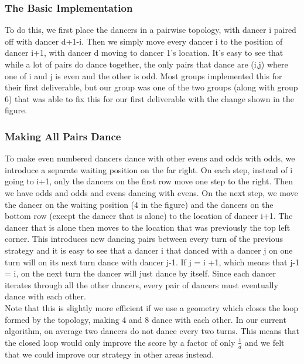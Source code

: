 \subsubsection{The Basic Implementation}
To do this, we first place the dancers in a pairwise topology, with dancer i paired off with dancer d+1-i. Then we simply move every dancer i to the position of dancer i+1, with dancer d moving to dancer 1's location. It's easy to see that while a lot of pairs do dance together, the only pairs that dance are (i,j) where one of i and j is even and the other is odd. Most groups implemented this for their first deliverable, but our group was one of the two groups (along with group 6) that was able to fix this for our first deliverable with the change shown in the figure.\\
\subsubsection{Making All Pairs Dance}
To make even numbered dancers dance with other evens and odds with odds, we introduce a separate waiting position on the far right. On each step, instead of i going to i+1, only the dancers on the first row move one step to the right. Then we have odds and odds and evens dancing with evens. On the next step, we move the dancer on the waiting position (4 in the figure) and the dancers on the bottom row (except the dancer that is alone) to the location of dancer i+1. The dancer that is alone then moves to the location that was previously the top left corner. This introduces new dancing pairs between every turn of the previous strategy and it is easy to see that a dancer i that danced with a dancer j on one turn will on its next turn dance with dancer j-1. If j = i +1, which means that j-1 = i, on the next turn the dancer will just dance by itself. Since each dancer iterates through all the other dancers, every pair of dancers must eventually dance with each other.\\
Note that this is slightly more efficient if we use a geometry which closes the loop formed by the topology, making 4 and 8 dance with each other. In our current algorithm, on average two dancers do not dance every two turns. This means that the closed loop would only improve the score by a factor of only $\frac{1}{d}$ and we felt that we could improve our strategy in other areas instead.\\
